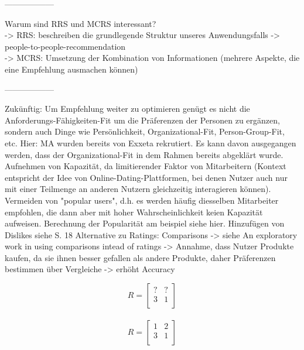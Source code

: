 ------------------

Warum sind RRS und MCRS interessant?\\
-> RRS: beschreiben die grundlegende Struktur unseres Anwendungsfalls -> people-to-people-recommendation\\
-> MCRS: Umsetzung der Kombination von Informationen (mehrere Aspekte, die eine Empfehlung ausmachen können)

------------------

Zukünftig:
Um Empfehlung weiter zu optimieren genügt es nicht die Anforderungs-Fähigkeiten-Fit um die Präferenzen der Personen zu ergänzen, sondern auch Dinge wie Persönlichkeit, Organizational-Fit, Person-Group-Fit, etc.
Hier: MA wurden bereits von Exxeta rekrutiert. Es kann davon ausgegangen werden, dass der Organizational-Fit in dem Rahmen bereits abgeklärt wurde.
Aufnehmen von Kapazität, da limitierender Faktor von Mitarbeitern (Kontext entspricht der Idee von Online-Dating-Plattformen, bei denen Nutzer auch nur mit einer Teilmenge an anderen Nutzern gleichzeitig interagieren können). %
Vermeiden von "popular users", d.h. es werden häufig diesselben Mitarbeiter empfohlen, die dann aber mit hoher Wahrscheinlichkeit keien Kapazität aufweisen. Berechnung der Popularität am beispiel siehe hier. %
Hinzufügen von Dislikes siehe S. 18 %
Alternative zu Ratings: Comparisons -> siehe An exploratory work in using comparisons intead of ratings -> Annahme, dass Nutzer Produkte kaufen, da sie ihnen besser gefallen als andere Produkte, daher Präferenzen bestimmen über Vergleiche -> erhöht Accuracy %


$$
R=\begin{bmatrix}
    ? & ? \\
    3 & 1 \\
\end{bmatrix}
$$\\

$$
R=\begin{bmatrix}
    1 & 2 \\
    3 & 1 \\
\end{bmatrix}
$$\\

